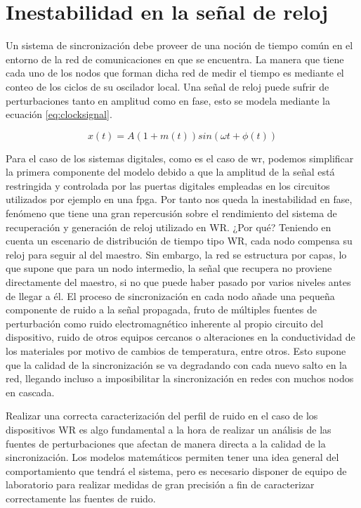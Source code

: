 \chapter{Inestabilidad en la señal de reloj}

Un sistema de sincronización debe proveer de una noción de tiempo común en el 
entorno de la red de comunicaciones en que se encuentra. La manera que tiene 
cada uno de los nodos que forman dicha red de medir el tiempo es mediante el 
conteo de los ciclos de su oscilador local. Una señal de reloj puede sufrir de 
perturbaciones tanto en amplitud como en fase, esto se modela mediante la 
ecuación \ref*{eq:clocksignal}.

\begin{equation}\label{eq:clocksignal}
x(t) = A(1+m(t))sin(\omega t + \phi (t))
\end{equation}

Para el caso de los sistemas digitales, como es el caso de \gls{wr}, podemos 
simplificar la primera componente del modelo debido a que la amplitud de la 
señal está restringida y controlada por las puertas digitales empleadas en los 
circuitos utilizados por ejemplo en una \gls{fpga}. Por tanto nos queda la 
inestabilidad en fase, fenómeno que tiene una gran repercusión sobre el 
rendimiento del sistema de recuperación y generación de reloj utilizado en WR. 
¿Por qué? Teniendo en cuenta un escenario de distribución de tiempo tipo WR, 
cada nodo compensa su reloj para seguir al del maestro. Sin embargo, la red se 
estructura por capas, lo que supone que para un nodo intermedio, la señal que 
recupera no proviene directamente del maestro, si no que puede haber pasado por 
varios niveles antes de llegar a él. El proceso de sincronización en cada nodo 
añade una pequeña componente de ruido a la señal propagada, fruto de múltiples 
fuentes de perturbación como ruido electromagnético inherente al propio 
circuito del dispositivo, ruido de otros equipos cercanos o alteraciones en la 
conductividad de los materiales por motivo de cambios de temperatura, entre 
otros. Esto supone que la calidad de la sincronización se va degradando con 
cada nuevo salto en la red, llegando incluso a imposibilitar la sincronización 
en redes con muchos nodos en cascada.

Realizar una correcta caracterización del perfil de ruido en el caso de los 
dispositivos WR es algo fundamental a la hora de realizar un análisis de las 
fuentes de perturbaciones que afectan de manera directa a la calidad de la 
sincronización. Los modelos matemáticos permiten tener una idea general del 
comportamiento que tendrá el sistema, pero es necesario disponer de equipo de 
laboratorio para realizar medidas de gran precisión a fin de caracterizar 
correctamente las fuentes de ruido.

